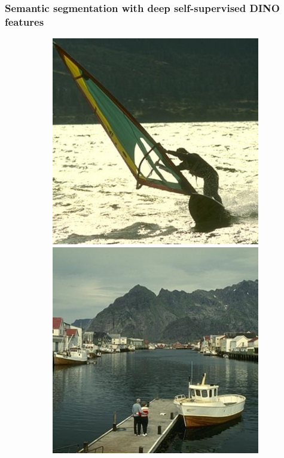 \documentclass{beamer}
\begin{document}
\begin{frame}
    \frametitle{Semantic segmentation with deep self-supervised DINO features}
    \begin{figure}
        \centering
        \begin{subfigure}[b]{0.16\textwidth}
            \centering
            \includegraphics[width=\textwidth]{../figures/dino/tile_2/62096.jpg}
            \includegraphics[width=\textwidth]{../figures/dino/tile_2/219090.jpg}

\end{subfigure}
\end{figure}
\end{frame}
\end{document}

